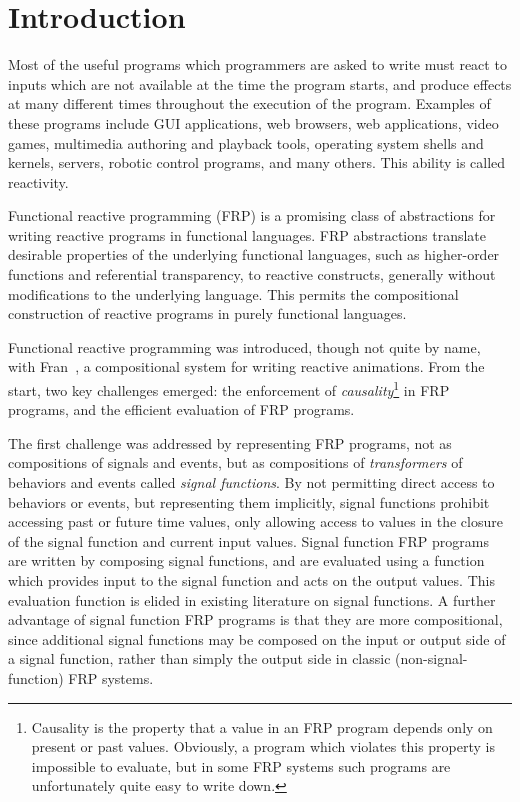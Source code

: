 \chapter{Introduction}
\label{chapter:Introduction}

Most of the useful programs which programmers are asked to write must react to inputs which are not available at the time the program starts,
and produce effects at many different times throughout the execution of the program. Examples of these programs include GUI applications,
web browsers, web applications, video games, multimedia authoring and playback tools, operating system shells and kernels, servers,
robotic control programs, and many others. This ability is called reactivity.

Functional reactive programming (FRP) is a promising class of abstractions for writing reactive programs in functional languages. FRP 
abstractions translate desirable properties of the underlying functional languages, such as higher-order functions and referential
transparency, to reactive constructs, generally without modifications to the underlying language. This permits the compositional
construction of reactive programs in purely functional languages.

Functional reactive programming was introduced, though not quite by name, with Fran~\cite{Elliott1997}, a compositional system for writing
reactive animations. From the start, two key challenges emerged: the enforcement of {\em causality}\footnote{Causality is the property 
that a value in an FRP program depends only on present or past values. Obviously, a program which violates this property is impossible to
evaluate, but in some FRP systems such programs are unfortunately quite easy to write down.} in FRP programs, and the efficient
evaluation of FRP programs.

The first challenge was addressed by representing FRP programs, not as compositions of signals and events, but as compositions of
{\em transformers} of behaviors and events called {\em signal functions}. By not permitting direct access to behaviors or events, but
representing them implicitly, signal functions prohibit accessing past or future time values, only allowing access to values in the closure of the signal function
and current input values. Signal function FRP programs are written by composing signal functions, and are evaluated using a function which provides input to the
signal function and acts on the output values. This evaluation function is elided in existing literature on signal functions. 
A further advantage of signal function FRP programs is that they are more compositional, since additional signal functions may be composed
on the input or output side of a signal function, rather than simply the output side in classic (non-signal-function) FRP systems.

